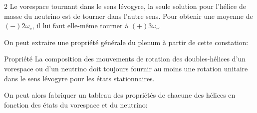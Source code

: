 \begin{multicols}{2}
Le vorespace tournant dans le sens lévogyre, la seule solution pour l'hélice de masse du neutrino est de tourner dans l'autre sens. Pour obtenir une moyenne de $(-)2 \omega_v$, il lui faut elle-même tourner à $(+) 3 \omega_v$.

On peut extraire une propriété générale du plenum à partir de cette constation:

\begin{mybox}[breakable,colback=blue!10, colbacktitle=pkcolor]{Propriété}
	La composition des mouvements de rotation des doubles-hélices d'un vorespace ou d'un neutrino doit toujours fournir au moins une rotation unitaire dans le sens lévogyre pour les états stationnaires.
\end{mybox}
\medskip

On peut alors fabriquer un tableau des propriétés de chacune des hélices en fonction des états du vorespace et du neutrino:
\vspace*{-0.5cm}
\begin{center}
\end{center}


\end{multicols}
